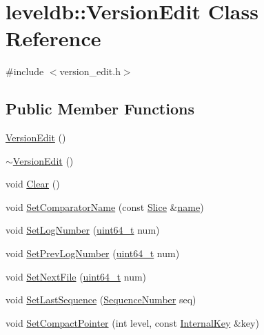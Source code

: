 \hypertarget{classleveldb_1_1_version_edit}{\section{leveldb\-:\-:Version\-Edit Class Reference}
\label{classleveldb_1_1_version_edit}
}


{\ttfamily \#include $<$version\-\_\-edit.\-h$>$}

\subsection*{Public Member Functions}
\begin{DoxyCompactItemize}
\item 
\hyperlink{classleveldb_1_1_version_edit_a60dd9c72d256ed1bda68597a9263333e}{Version\-Edit} ()
\item 
\hyperlink{classleveldb_1_1_version_edit_a8863bc7fa645c4bc2518910429447fbe}{$\sim$\-Version\-Edit} ()
\item 
void \hyperlink{classleveldb_1_1_version_edit_a259c9de14d58e231178904c1559e4b5e}{Clear} ()
\item 
void \hyperlink{classleveldb_1_1_version_edit_ab562147cdd82b184e86e88bd375a718c}{Set\-Comparator\-Name} (const \hyperlink{classleveldb_1_1_slice}{Slice} \&\hyperlink{testharness_8cc_a8f8f80d37794cde9472343e4487ba3eb}{name})
\item 
void \hyperlink{classleveldb_1_1_version_edit_a47e5c58d34b0e27dc8990687e0c5477a}{Set\-Log\-Number} (\hyperlink{stdint_8h_aaa5d1cd013383c889537491c3cfd9aad}{uint64\-\_\-t} num)
\item 
void \hyperlink{classleveldb_1_1_version_edit_ac1b5689f62e7a8f63c4eefa437a4f2f3}{Set\-Prev\-Log\-Number} (\hyperlink{stdint_8h_aaa5d1cd013383c889537491c3cfd9aad}{uint64\-\_\-t} num)
\item 
void \hyperlink{classleveldb_1_1_version_edit_a4c104515adf573be0ead29e6835f14fb}{Set\-Next\-File} (\hyperlink{stdint_8h_aaa5d1cd013383c889537491c3cfd9aad}{uint64\-\_\-t} num)
\item 
void \hyperlink{classleveldb_1_1_version_edit_abd6e841ed400672d33d26f4b187a66bf}{Set\-Last\-Sequence} (\hyperlink{namespaceleveldb_a5481ededd221c36d652c371249f869fa}{Sequence\-Number} seq)
\item 
void \hyperlink{classleveldb_1_1_version_edit_ac9b26dfba1188705d7fc4deaf047271c}{Set\-Compact\-Pointer} (int level, const \hyperlink{classleveldb_1_1_internal_key}{Internal\-Key} \&key)

\end{DoxyCompactItemize}
